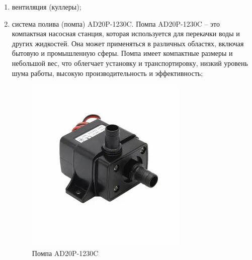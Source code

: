 \begin{enumerate}
    \item вентиляция (куллеры);
    
    
    \item система полива (помпа) AD20P-1230C. Помпа AD20P-1230C – это компактная насосная станция, которая используется для перекачки воды и других жидкостей. Она может применяться в различных областях, включая бытовую и промышленную сферы. Помпа имеет компактные размеры и небольшой вес, что облегчает установку и транспортировку, низкий уровень шума работы, высокую производительность и эффективность;

    \begin{figure}[H]
        \centering
        \includegraphics[scale=0.6]{images/pump.jpg}
        \caption{Помпа AD20P-1230C}
        \label{fig:pump}
    \end{figure}
    

\end{enumerate}
